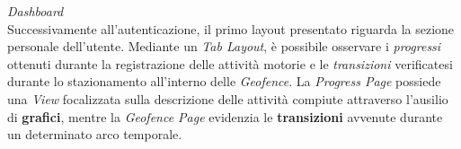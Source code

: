 \documentclass{article}
\begin{document}
    \textit{Dashboard}  \vspace*{7pt}\\
    Successivamente all'autenticazione, il primo layout presentato riguarda la sezione personale dell'utente. Mediante un \textit{Tab Layout}, è possibile osservare i \textit{progressi}
    ottenuti durante la registrazione delle attività motorie e le \textit{transizioni} verificatesi durante lo stazionamento all'interno delle \textit{Geofence}.
    La \textit{Progress Page} possiede una \textit{View} focalizzata sulla descrizione delle attività compiute attraverso l'ausilio di \textbf{grafici}, mentre la 
    \textit{Geofence Page} evidenzia le \textbf{transizioni} avvenute durante un determinato arco temporale.
    \begin{center}
        \begin{figure}[H]
            \centering
        \end{figure}
    \end{center}
\end{document}

